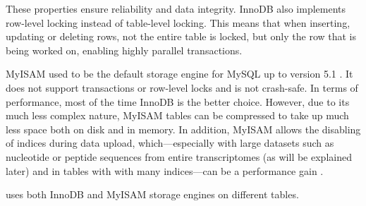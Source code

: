 These properties ensure reliability and data integrity. InnoDB also implements
row-level locking instead of table-level locking. This means that when
inserting, updating or deleting rows, not the entire table is locked, but only
the row that is being worked on, enabling highly parallel transactions. 

MyISAM used to be the default storage engine for MySQL up to version 5.1
\citep{schwartz2012}. It does not support transactions or row-level locks and is
not crash-safe. In terms of performance, most of the time InnoDB is the better
choice. However, due to its much less complex nature, MyISAM tables can be
compressed to take up much less space both on disk and in memory. In addition,
MyISAM allows the disabling of indices during data upload, which---especially
with large datasets such as nucleotide or peptide sequences from entire
transcriptomes (as will be explained later) and in tables with with many
indices---can be a performance gain \citep{mysql2013}. 

\pname uses both InnoDB and MyISAM storage engines on different tables.
